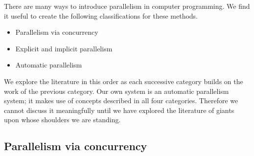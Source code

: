 There are many ways to introduce parallelism in computer programming.
We find it useful to create the following classifications for these methods.
\begin{itemize}
    \item Parallelism via concurrency

    \item Explicit and implicit parallelism


    \item Automatic parallelism

\end{itemize}
We explore the literature in this order as each successive category builds
on the work of the previous category.
Our own system is an automatic parallelism system;
it makes use of concepts described in all four categories.
Therefore
we cannot discuss it meaningfully until we have explored the literature
of giants upon whose shoulders we are standing.


\subsection{Parallelism via concurrency}
\label{sec:intro_concurrency}

